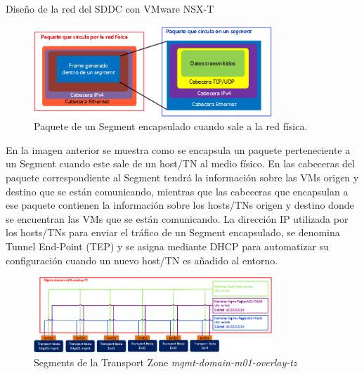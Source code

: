 \begin{subsubsection}{Diseño de la red del SDDC con VMware NSX-T}
\begin{itemize}
    \end{itemize}
    \begin{figure}[h]
        \centering
        \includegraphics[width=0.8\textwidth]{imaxes/pruebaconcepto/Frame.png}
        \caption{Paquete de un Segment encapsulado cuando sale a la red física.}
        \label{fig:Frame-Segment-NSXT}
    \end{figure}
    \FloatBarrier
    En la imagen anterior se muestra como se encapsula un paquete perteneciente a un Segment cuando este sale de un host/TN al medio físico. En las cabeceras del paquete correspondiente al Segment tendrá la información sobre las VMs origen y destino que se están comunicando, mientras que las cabeceras que encapsulan a ese paquete contienen la información sobre los hosts/TNs origen y destino donde se encuentran las VMs que se están comunicando. La dirección IP utilizada por los hosts/TNs para enviar el tráfico de un Segment encapsulado, se denomina Tunnel End-Point (TEP) y se asigna mediante DHCP para automatizar su configuración cuando un nuevo host/TN es añadido al entorno.

    \begin{figure}[h]
        \centering
        \includegraphics[width=0.8\textwidth]{imaxes/pruebaconcepto/OverlayTZSegments.png}
        \caption{Segments de la Transport Zone \textit{mgmt-domain-m01-overlay-tz}}
        \label{fig:overlay-TZ-segments-NSXT}
      \end{figure}
      \FloatBarrier


\end{subsubsection}
